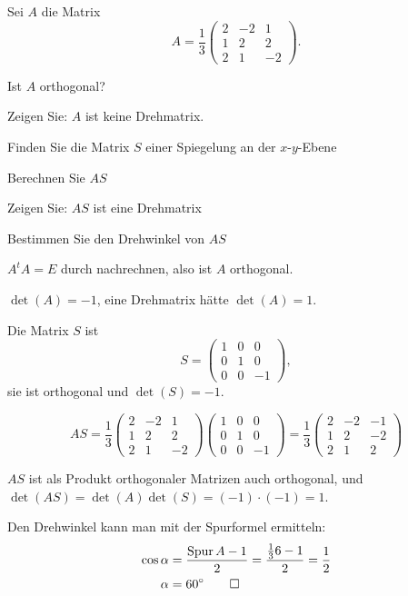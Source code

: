 Sei $A$ die Matrix
\[
A=\frac13\begin{pmatrix}
2&-2& 1\\
1& 2& 2\\
2& 1&-2
\end{pmatrix}.
\]
\begin{teilaufgaben}
\item Ist $A$ orthogonal?
\item Zeigen Sie: $A$ ist keine Drehmatrix.
\item Finden Sie die Matrix $S$ einer Spiegelung an der $x$-$y$-Ebene
\item Berechnen Sie $AS$
\item Zeigen Sie: $AS$ ist eine Drehmatrix
\item Bestimmen Sie den Drehwinkel von $AS$
\end{teilaufgaben}

\begin{loesung}
\begin{teilaufgaben}
\item $A^tA=E$ durch nachrechnen, also ist $A$ orthogonal.
\item $\det(A)=-1$, eine Drehmatrix hätte $\det(A)=1$.
\item Die Matrix $S$ ist
\[
S=\begin{pmatrix}1&0&0\\0&1&0\\0&0&-1\end{pmatrix},
\]
sie ist orthogonal und $\det(S)=-1$.
\item
\[
AS=\frac13\begin{pmatrix}
2&-2& 1\\
1& 2& 2\\
2& 1&-2
\end{pmatrix}
\begin{pmatrix}1&0&0\\0&1&0\\0&0&-1\end{pmatrix}
=
\frac13\begin{pmatrix}
2&-2&-1\\
1& 2&-2\\
2& 1& 2
\end{pmatrix}
\]
\item $AS$ ist als Produkt orthogonaler Matrizen auch orthogonal,
und $\det(AS)=\det(A)\det(S)=(-1)\cdot(-1)=1$.
\item Den Drehwinkel kann man mit der Spurformel ermitteln:
\begin{align*}
\cos\alpha&= \frac{\operatorname{Spur} A -1}2=\frac{\frac136-1}2=\frac12
\\
\alpha&=60^\circ
\qedhere
\end{align*}
\end{teilaufgaben}
\end{loesung}

